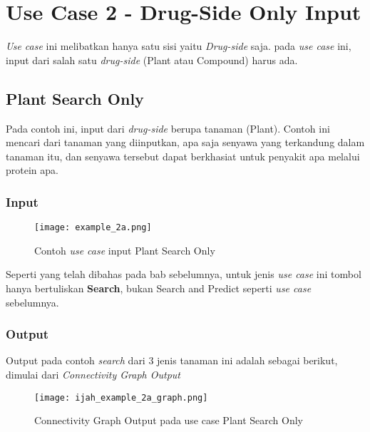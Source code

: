 \chapter{Use Case 2 - Drug-Side Only Input}

\emph{Use case} ini melibatkan hanya satu sisi yaitu \emph{Drug-side} saja. pada \emph{use case} ini, input dari salah satu \emph{drug-side} (Plant atau Compound) harus ada.

\section{Plant Search Only}

Pada contoh ini, input dari \emph{drug-side} berupa tanaman (Plant). Contoh ini mencari dari tanaman yang diinputkan, apa saja senyawa yang terkandung dalam tanaman itu, dan senyawa tersebut dapat berkhasiat untuk penyakit apa melalui protein apa.

\subsection{Input}
\begin{figure}[H]
	\centering
	\texttt{[image: example\_2a.png]}
	\caption{Contoh \emph{use case} input Plant Search Only}
	\label{fig:example_2a}
\end{figure}

Seperti yang telah dibahas pada bab sebelumnya, untuk jenis \emph{use case} ini tombol hanya bertuliskan \textbf{Search}, bukan Search and Predict seperti \emph{use case} sebelumnya.

\subsection{Output}
Output pada contoh \emph{search} dari 3 jenis tanaman ini adalah sebagai berikut, dimulai dari \emph{Connectivity Graph Output}

\begin{figure}[H]
	\centering
	\texttt{[image: ijah\_example\_2a\_graph.png]}
	\caption{Connectivity Graph Output pada use case Plant Search Only}
	\label{fig:ijah_example_2a_output}
\end{figure}

